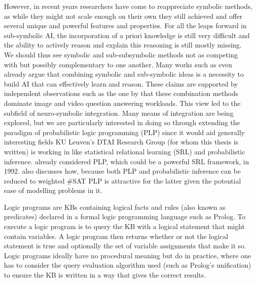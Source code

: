 However, in recent years researchers have come to reappreciate symbolic methods, as while they might not scale enough on their own they still achieved and offer several unique and powerful features and properties. For all the leaps forward in sub-symbolic AI, the incorporation of a priori knowledge is still very difficult and the ability to actively reason and explain this reasoning is still mostly missing. We should thus see symbolic and sub-subsymbolic methods not as competing with but possibly complementary to one another. Many works such as \cite{garcez2015neural} even already argue that combining symbolic and sub-symbolic ideas is a necessity to build AI that can effectively learn and reason. These claims are supported by independent observations such as the one by \cite{susskind2021neuro} that these combination methods dominate image and video question answering workloads. This view led to the subfield of neuro-symbolic integration. Many means of integration are being explored, but we are particularly interested in doing so through extending the paradigm of probabilistic logic programming (PLP) since it would aid generally interesting fields KU Leuven's DTAI Research Group (for whom this thesis is written) is working in like statistical relational learning (SRL) and probabilistic inference. \cite{ng1992probabilistic} already considered PLP, which could be a powerful SRL framework, in 1992. \cite{fierens2015inference} also discusses how, because both PLP and probabilistic inference can be reduced to weighted \#SAT PLP is attractive for the latter given the potential ease of modelling problems in it. \par
Logic programs are KBs containing logical facts and rules (also known as predicates) declared in a formal logic programming language such as Prolog. To execute a logic program is to query the KB with a logical statement that might contain variables. A logic program then returns whether or not the logical statement is true and optionally the set of variable assignments that make it so. Logic programs ideally have no procedural meaning but do in practice, where one has to consider the query evaluation algorithm used (such as Prolog's unification) to ensure the KB is written in a way that gives the correct results. \par
